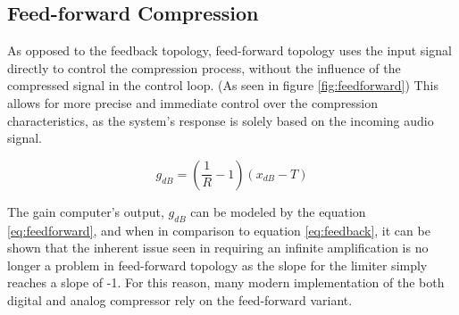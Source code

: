 \documentclass[10pt]{article}
\begin{document}
\begin{multicols*}{2}
\begin{minipage}{\linewidth}
                    \end{minipage}
                
                \vspace{2ex}

            \subsection{Feed-forward Compression}
                As opposed to the feedback topology, feed-forward topology uses the input signal directly to control the compression process, without the influence of the compressed signal in the control loop. (As seen in figure \ref{fig:feedforward}) This allows for more precise and immediate control over the compression characteristics, as the system's response is solely based on the incoming audio signal.\par

                    \begin{equation}\label{eq:feedforward}
                        g_{dB}=(\frac{1}{R}-1)(x_{dB}-T)
                    \end{equation}
                    
                \noindent The gain computer's output, $g_{dB}$ can be modeled by the equation \ref{eq:feedforward}, and when in comparison to equation \ref{eq:feedback}, it can be shown that the inherent issue seen in requiring an infinite amplification is no longer a problem in feed-forward topology as the slope for the limiter simply reaches a slope of -1. For this reason, many modern implementation of the both digital and analog compressor rely on the feed-forward variant.

                \vspace{2ex}

                    \noindent
                    \begin{minipage}{\linewidth}

                        \centering

\end{minipage}
\end{multicols*}
\end{document}
